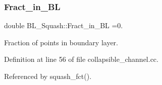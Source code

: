 \subsubsection{\texorpdfstring{Fract\+\_\+in\+\_\+\+BL}{Fract\_in\_BL}}
{\footnotesize\ttfamily double B\+L\+\_\+\+Squash\+::\+Fract\+\_\+in\+\_\+\+BL =0.}



Fraction of points in boundary layer. 



Definition at line 56 of file collapsible\+\_\+channel.\+cc.



Referenced by squash\+\_\+fct().

